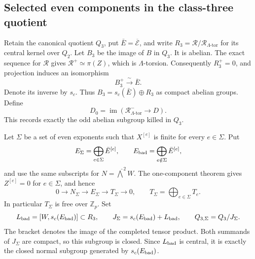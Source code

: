 \subsection{Selected even components in the class-three quotient}
\label{subsec:selected-class-three}

Retain the canonical quotient $Q_3$, put $\bar E=\overline{\mathcal E}$, and write
$R_3=\mathcal R/\mathcal R_{\Lambda\text{-tor}}$ for its central
kernel over $Q_2$.  Let $B_3$ be the image of $B$ in $Q_3$.
It is abelian.  The exact sequence for $\mathcal R$ gives
$\mathcal R^+\simeq\pi(Z)$, which is $\Lambda$-torsion.
Consequently $R_3^+=0$, and projection induces an isomorphism
\[
 B_3^+\xrightarrow{\ \sim\ }\bar E.
\]
Denote its inverse by $s_c$.  Thus
$B_3=s_c(\bar E)\oplus R_3$ as compact abelian groups.
Define
\[
 D_0=\operatorname{im}
   (\mathcal R_{\Lambda\text{-tor}}^-\longrightarrow D).
\]
This records exactly the odd abelian subgroup killed in $Q_3$.

Let $\Sigma$ be a set of even exponents such that $X^{[e]}$ is
finite for every $e\in\Sigma$.  Put
\[
 E_\Sigma=\bigoplus_{e\in\Sigma}\bar E^{[e]},\qquad
 E_{\rm bad}=\bigoplus_{e\notin\Sigma}\bar E^{[e]},
\]
and use the same subscripts for
$N=\widehat\bigwedge^2 W$.  The one-component theorem gives
$Z^{[e]}=0$ for $e\in\Sigma$, and hence
\[
 0\longrightarrow N_\Sigma\longrightarrow E_\Sigma
   \longrightarrow T_\Sigma\longrightarrow0,
 \qquad T_\Sigma=\bigoplus_{e\in\Sigma}T_e.
\]
In particular $T_\Sigma$ is free over $\mathbb Z_p$.
Set
\[
 L_{\rm bad}=[W,s_c(E_{\rm bad})]\subset R_3,
 \qquad
 J_\Sigma=s_c(E_{\rm bad})+L_{\rm bad},
 \qquad Q_{3,\Sigma}=Q_3/J_\Sigma.
\]
The bracket denotes the image of the completed tensor product.
Both summands of $J_\Sigma$ are compact, so this subgroup is
closed.  Since $L_{\rm bad}$ is central, it is exactly the closed
normal subgroup generated by $s_c(E_{\rm bad})$.

